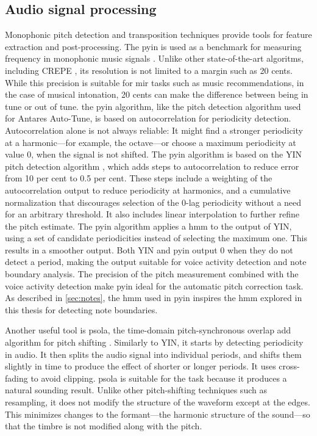 \subsection{Audio signal processing}
Monophonic pitch detection and transposition techniques provide tools for feature extraction and post-processing. The \gls{pyin} \cite{mauch2014pyin} is used as a benchmark for measuring frequency in monophonic music signals \cite{devaney2020new}. Unlike other state-of-the-art algoritms, including CREPE \cite{kim2018crepe}, its resolution is not limited to a margin such as 20 cents. While this precision is suitable for \gls{mir} tasks such as music recommendations, in the case of musical intonation, 20 cents can make the difference between being in tune or out of tune. the \gls{pyin} algorithm, like the pitch detection algorithm used for Antares Auto-Tune, is based on autocorrelation for periodicity detection. Autocorrelation alone is not always reliable: It might find a stronger periodicity at a harmonic---for example, the octave---or choose a maximum periodicity at value 0, when the signal is not shifted. The \gls{pyin} algorithm is based on the YIN pitch detection algorithm \cite{de2002yin}, which adds steps to autocorrelation to reduce error from 10 per cent to 0.5 per cent. These steps include a weighting of the autocorrelation output to reduce periodicity at harmonics, and a cumulative normalization that discourages selection of the 0-lag periodicity without a need for an arbitrary threshold. It also includes linear interpolation to further refine the pitch estimate. The \gls{pyin} algorithm applies a \gls{hmm} to the output of YIN, using a set of candidate periodicities instead of selecting the maximum one. This results in a smoother output. Both YIN and \gls{pyin} output 0 when they do not detect a period, making the output suitable for voice activity detection and note boundary analysis. The precision of the pitch measurement combined with the voice activity detection make \gls{pyin} ideal for the automatic pitch correction task. As described in \ref{sec:notes}, the \gls{hmm} used in \gls{pyin} inspires the \gls{hmm} explored in this thesis for detecting note boundaries. 

Another useful tool is \gls{psola}, the time-domain pitch-synchronous overlap add algorithm for pitch shifting \cite{charpentier1986diphone}. Similarly to YIN, it starts by detecting periodicity in audio. It then splits the audio signal into individual periods, and shifts them slightly in time to produce the effect of shorter or longer periods. It uses cross-fading to avoid clipping. \gls{psola} is suitable for the task because it produces a natural sounding result. Unlike other pitch-shifting techniques such as resampling, it does not modify the structure of the waveform except at the edges. This minimizes changes to the formant---the harmonic structure of the sound---so that the timbre is not modified along with the pitch. 

